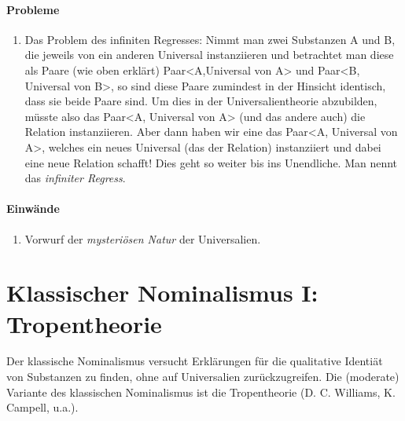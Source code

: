 \documentclass[../main.tex]{subfiles}
\begin{document}
\paragraph{Probleme} 
\begin{enumerate}
	\item Das Problem des infiniten Regresses: Nimmt man zwei Substanzen A und B, die jeweils von ein anderen Universal instanziieren und betrachtet man diese als Paare (wie oben erklärt) Paar<A,Universal von A> und Paar<B, Universal von B>, so sind diese Paare zumindest in der Hinsicht identisch, dass sie beide Paare sind. Um dies in der Universalientheorie abzubilden, müsste also das Paar<A, Universal von A> (und das andere auch) die Relation instanziieren. Aber dann haben wir eine das Paar<A, Universal von A>, welches ein neues Universal (das der Relation) instanziiert und dabei eine neue Relation schafft! Dies geht so weiter bis ins Unendliche. Man nennt das \textit{infiniter Regress}.
		\begin{minipage}[t]{\linewidth}
          \raggedright
    	\end{minipage}
\end{enumerate}

\paragraph{Einwände}
\begin{enumerate}
	\item Vorwurf der \textit{mysteriösen Natur} der Universalien.
\end{enumerate}

\section{Klassischer Nominalismus I: Tropentheorie}
Der klassische Nominalismus versucht Erklärungen für die qualitative Identiät von Substanzen zu finden, ohne auf Universalien zurückzugreifen. Die (moderate) Variante des klassischen Nominalismus ist die Tropentheorie (D. C. Williams, K. Campell, u.a.).
\end{document}
